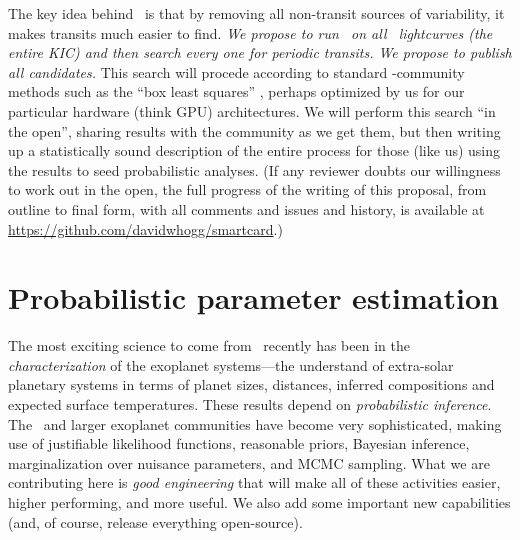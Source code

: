 \documentclass[letterpaper,12pt,preprint]{hack_aastex}
\newcommand{\hurl}[1]{{\scriptsize\url{#1}}}
\newcommand{\Untrendy}{\package{Untrendy}}
\begin{document}
The key idea behind \Untrendy\ is that by removing all non-transit
sources of variability, it makes transits much easier to find.
\emph{We propose to run \Untrendy\ on all \Kepler\ lightcurves (the
  entire KIC) and then search every one for periodic transits.  We
  propose to publish all candidates.}
This search will procede
according to standard \Kepler-community methods such as the ``box
least squares'' \citep{box}, perhaps optimized by us for our particular
hardware (think GPU) architectures.
We will perform this search ``in
the open'', sharing results with the community as we get them, but
then writing up a statistically sound description of the entire
process for those (like us) using the results to seed probabilistic
analyses.
(If any reviewer doubts our willingness to work out in the open, the
full progress of the writing of this proposal, from outline to final
form, with all comments and issues and history, is available at
\hurl{https://github.com/davidwhogg/smartcard}.)


\section{Probabilistic parameter estimation}

The most exciting science to come from \Kepler\ recently has been in
the \emph{characterization} of the exoplanet systems---the understand
of extra-solar planetary systems in terms of planet sizes, distances,
inferred compositions and expected surface temperatures.  These
results depend on \emph{probabilistic inference}.  The \Kepler\ and
larger exoplanet communities have become very sophisticated, making
use of justifiable likelihood functions, reasonable priors, Bayesian
inference, marginalization over nuisance parameters, and MCMC
sampling.  What we are contributing here is \emph{good engineering}
that will make all of these activities easier, higher performing, and
more useful.  We also add some important new capabilities (and, of course, release everything open-source).
\end{document}
